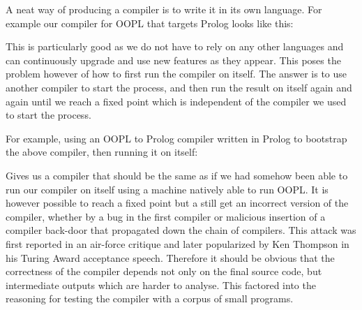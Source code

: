 \documentclass[12pt,a4paper,twoside,openright]{report}
\newcommand{\tblocktext}[3]{
    {#1} \& $\to$   \& {#2} \\
    {}     \&  {#3}   \&      \\
}
\newcommand{\tblockoutline}[1]{
    \draw (#1-1-1.south west) |- (#1-1-3.north east) |- (#1-1-3.south west) |- (#1-2-2.south west) |- (#1-1-1.south west);
}
\newcommand{\wblocktext}[1]{
    {#1} \\
    {}\\
}
\newcommand{\wblockoutline}[1]{
    \draw (#1-1-1.south west) |- (#1-1-1.north east) -- (#1-1-1.south east) -- (#1-2-1.south) -- (#1-1-1.south west);
}
\newcommand{\wsupt}[2]{
	\node(mac#2) at (#2-2-2.south west) [wblock, anchor = mac#2-1-1.north west] {\wblocktext{#1}};
	\wblockoutline{mac#2};
}
\begin{document}
A neat way of producing a compiler is to write it in its own language. For example our compiler for OOPL that targets Prolog looks like this:

\begin{center}
\end{center}

This is particularly good as we do not have to rely on any other languages and can continuously upgrade and use new features as they appear. This poses the problem however of how to first run the compiler on itself. The answer is to use another compiler to start the process, and then run the result on itself again and again until we reach a fixed point which is independent of the compiler we used to start the process.

 \bigskip
 
For example, using an OOPL to Prolog compiler written in Prolog to bootstrap the above compiler, then running it on itself:

\begin{center}
\end{center}

Gives us a compiler that should be the same as if we had somehow been able to run our compiler on itself using a machine natively able to run OOPL. It is however possible to reach a fixed point but a still get an incorrect version of the compiler, whether by a bug in the first compiler or malicious insertion of a compiler back-door that propagated down the chain of compilers. This attack was first reported in an air-force critique\cite{MULTICS} and later popularized by Ken Thompson in his Turing Award acceptance speech\cite{KEN}. Therefore it should be obvious that the correctness of the compiler depends not only on the final source code, but intermediate outputs which are harder to analyse. This factored into the reasoning for testing the compiler with a corpus of small programs.
\end{document}
